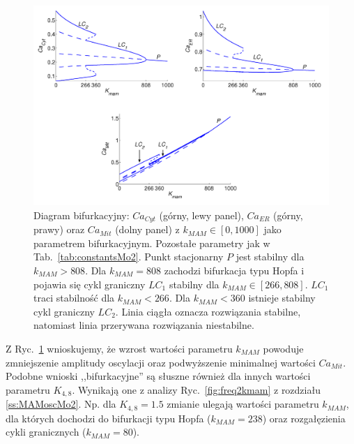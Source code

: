 \begin{figure}[ht!]
    \centering
    \includegraphics[width=1\textwidth]{rysunki/rozdzial_5/diagram3_1}
    \caption[Diagram bifurkacyjny dla Modelu \#2]{Diagram bifurkacyjny: $Ca_{Cyt}$ (górny, lewy panel), $Ca_{ER}$ (górny, prawy) oraz $Ca_{Mit}$ (dolny panel) z $k_{MAM} \in [0, 1000]$ jako parametrem bifurkacyjnym. Pozostałe parametry jak w Tab.~\ref{tab:constantsMo2}. Punkt stacjonarny $P$ jest stabilny dla $k_{MAM}>808$. Dla $k_{MAM}=808$ zachodzi bifurkacja typu Hopfa i pojawia się cykl graniczny $LC_1$ stabilny dla $k_{MAM} \in[266,808]$. $LC_1$ traci stabilność dla $k_{MAM}<266$. Dla $k_{MAM}<360$ istnieje stabilny cykl graniczny $LC_2$. Linia ciągła oznacza rozwiązania stabilne, natomiast linia przerywana rozwiązania niestabilne.}
    \label{fig:minmax}
\end{figure}

Z Ryc.~\ref{fig:minmax} wnioskujemy, że wzrost wartości parametru $k_{MAM}$ powoduje zmniejszenie amplitudy oscylacji oraz podwyższenie minimalnej wartości $Ca_{Mit}$. Podobne wnioski ,,bifurkacyjne'' są słuszne również dla innych wartości parametru $K_{4,8}$. Wynikają one z  analizy Ryc.~\ref{fig:freq2kmam} z rozdziału \ref{ss:MAMoscMo2}. Np. dla $K_{4,8} = 1.5$ zmianie ulegają wartości parametru $k_{MAM}$, dla których dochodzi do bifurkacji typu Hopfa ($k_{MAM} = 238$) oraz rozgałęzienia cykli granicznych ($k_{MAM} = 80$).

